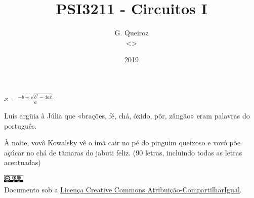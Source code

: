 \documentclass[a5paper,twoside,openany,10pt]{memoir}
\title{PSI3211 - Circuitos I}
\author{G. Queiroz\\<\mailto{gabrieljvnq@gmail.com}>}
\date{2019}
\newcommand{\link}[2]{\href{#2}{#1}}
\begin{document}
\maketitle

$x = \frac{-b \pm \sqrt{b^2 - 4ac}}{a}$

Luís argüia à Júlia que «brações, fé, chá, óxido, pôr, zângão» eram palavras do português.

À noite, vovô Kowalsky vê o ímã cair no pé do pinguim queixoso e vovó põe açúcar no chá de tâmaras do jabuti feliz. (90 letras, incluindo todas as letras acentuadas)

\begin{center}
\includegraphics[width=1cm]{CC-BY-SA.ps}\\
\footnotesize
Documento sob a \link{Licença Creative Commons Atribuição-CompartilharIgual}{https://creativecommons.org/licenses/by-sa/4.0/}.
\end{center}
\end{document}

